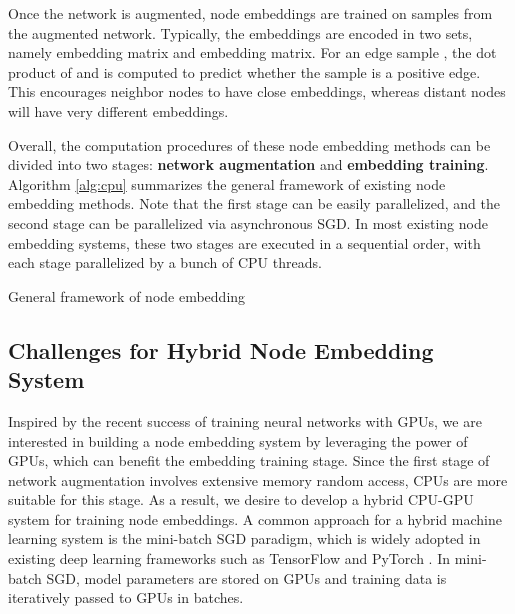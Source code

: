 \documentclass[sigconf]{acmart}
\begin{document}
Once the network is augmented, node embeddings are trained on samples from the augmented network. Typically, the embeddings are encoded in two sets, namely  embedding matrix and  embedding matrix. For an edge sample , the dot product of  and  is computed to predict whether the sample is a positive edge. This encourages neighbor nodes to have close embeddings, whereas distant nodes will have very different embeddings.

Overall, the computation procedures of these node embedding methods can be divided into two stages: \textbf{network augmentation} and \textbf{embedding training}. Algorithm \ref{alg:cpu} summarizes the general framework of existing node embedding methods. Note that the first stage can be easily parallelized, and the second stage can be parallelized via asynchronous SGD. In most existing node embedding systems, these two stages are executed in a sequential order, with each stage parallelized by a bunch of CPU threads.

\begin{algorithm}[!h]
    \caption{General framework of node embedding}
    \begin{algorithmic}[1]
        \State{}
        \For{} 
            \For{}
                \State{}
            \EndFor
        \EndFor
        
        \State{}
        
         
            \State{}
            \State{}
            \For{}
                \State{}
            \EndFor
        \EndFor
    \end{algorithmic}
    \label{alg:cpu}
\end{algorithm}

\subsection{Challenges for Hybrid Node Embedding System}
\label{sec:challenges}

Inspired by the recent success of training neural networks with GPUs, we are interested in building a node embedding system by leveraging the power of GPUs, which can benefit the embedding training stage. Since the first stage of network augmentation involves extensive memory random access, CPUs are more suitable for this stage. As a result, we desire to develop a hybrid CPU-GPU system for training node embeddings. A common approach for a hybrid machine learning system is the mini-batch SGD paradigm, which is widely adopted in existing deep learning frameworks such as TensorFlow \cite{abadi2016tensorflow} and PyTorch \cite{paszke2017automatic}. In mini-batch SGD, model parameters are stored on GPUs and training data is iteratively passed to GPUs in batches.
\end{document}
